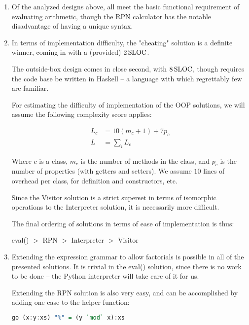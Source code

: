 \documentclass[]{article}
\begin{document}
\begin{enumerate}[label=\textbf{\alph{*})}]
\item Of the analyzed designs above, all meet the basic functional requirement of evaluating arithmetic, though the RPN calculator has the notable disadvantage of having a unique syntax.

\item In terms of implementation difficulty, the "cheating" solution is a definite winner, coming in with a (provided) $\unit[2]{SLOC}$. 

The outside-box design comes in close second, with $\unit[8]{SLOC}$, though requires the code base be written in Haskell -- a language with which regrettably few are familiar.

For estimating the difficulty of implementation of the OOP solutions, we will assume the following complexity score applies:

\begin{align}
L_c &= 10(m_c + 1) + 7p_c \\
L &= \sum_{i}{L_c}
\end{align}

Where $c$ is a class, $m_c$ is the number of methods in the class, and $p_c$ is the number of properties (with getters and setters). We assume $10$ lines of overhead per class, for definition and constructors, etc.

Since the Visitor solution is a strict superset in terms of isomorphic operations to the Interpreter solution, it is necessarily more difficult. 

The final ordering of solutions in terms of ease of implementation is thus:

\begin{center}
eval() $>$ RPN $>$ Interpreter $>$ Visitor
\end{center}



\item Extending the expression grammar to allow factorials is possible in all of the presented solutions. It is trivial in the eval() solution, since there is no work to be done -- the Python interpreter will take care of it for us.

Extending the RPN solution is also very easy, and can be accomplished by adding one case to the helper function:

\begin{lstlisting}[language=haskell]
        go (x:y:xs) "%" = (y `mod` x):xs
\end{lstlisting}


\end{enumerate}
\end{document}
